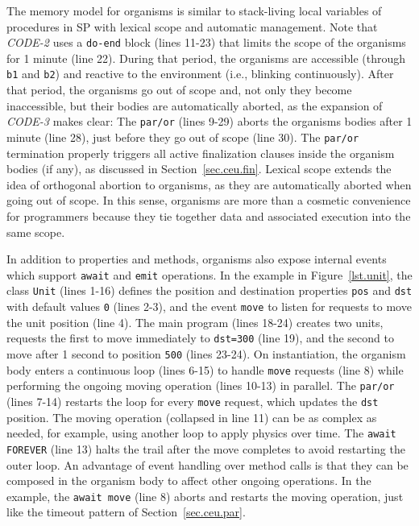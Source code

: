 \documentclass{sigplanconf}
\newcommand{\code}[1] {{\small{\texttt{#1}}}}
\newcommand{\1}{\;}
\newcommand{\2}{\;\;}
\newcommand{\3}{\;\;\;}
\newcommand{\5}{\;\;\;\;\;}
\begin{document}
%

The memory model for organisms is similar to stack-living local variables of 
procedures in SP with lexical scope and automatic management.
Note that \emph{CODE-2} uses a \code{do-end} block (lines 11-23) that limits 
the scope of the organisms for 1 minute (line 22).
%
During that period, the organisms are accessible (through \code{b1} and 
\code{b2}) and reactive to the environment (i.e., blinking continuously).
%
After that period, the organisms go out of scope and, not only they become 
inaccessible, but their bodies are automatically aborted, as the expansion of 
\emph{CODE-3} makes clear:
%
The \code{par/or} (lines 9-29) aborts the organisms bodies after 1 minute (line 
28), just before they go out of scope (line 30).
%
The \code{par/or} termination properly triggers all active finalization clauses 
inside the organism bodies (if any), as discussed in Section~\ref{sec.ceu.fin}.
%
Lexical scope extends the idea of orthogonal abortion to organisms, as they are 
automatically aborted when going out of scope.
%
In this sense, organisms are more than a cosmetic convenience for programmers 
because they tie together data and associated execution into the same scope.

In addition to properties and methods, organisms also expose internal events 
which support \code{await} and \code{emit} operations.
%
In the example in Figure~\ref{lst.unit}, the class \code{Unit} (lines 1-16) 
defines the position and destination properties \code{pos} and \code{dst} with 
default values \code{0} (lines 2-3), and the event \code{move} to listen for
requests to move the unit position (line 4).
%
The main program (lines 18-24) creates two units, requests the first to move 
immediately to \code{dst=300} (line 19), and the second to move after 1 second 
to position \code{500} (lines 23-24).
%
On instantiation, the organism body enters a continuous loop (lines 6-15) to 
handle \code{move} requests (line 8) while performing the ongoing moving 
operation (lines 10-13) in parallel.
The \code{par/or} (lines 7-14) restarts the loop for every \code{move} request,
which updates the \code{dst} position.
%
The moving operation (collapsed in line 11) can be as complex as needed, for 
example, using another loop to apply physics over time.
The \code{await FOREVER} (line 13) halts the trail after the move completes to 
avoid restarting the outer loop.
%
An advantage of event handling over method calls is that they can be composed 
in the organism body to affect other ongoing operations.
In the example, the \code{await move} (line 8) aborts and restarts the moving 
operation, just like the timeout pattern of Section~\ref{sec.ceu.par}.
\end{document}
